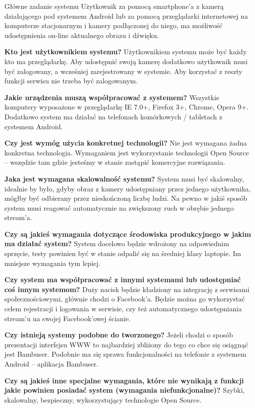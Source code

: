 \begin{userstory}{Główne zadanie systemu}
Użytkownik za pomocą smartphone'a z kamerą działającego pod systemem Android lub za pomocą przeglądarki internetowej na komputerze stacjonarnym i kamery podłączonej do niego, ma możliwość udostępnienia on-line aktualnego obrazu i dźwięku.
    \begin{questions}
        \item{
            \textbf{Kto jest użytkownikiem systemu?} Użytkownikiem systemu może być każdy kto ma przeglądarkę. Aby udostępnić swoją kamerę dodatkowo użytkownik musi być zalogowany, a wcześniej zarejestrowany w systemie. Aby korzystać z reszty funkcji serwisu nie trzeba być zalogowanym.
        }
        \item{
            \textbf{Jakie urządzenia muszą współpracować z systemem?} Wszystkie komputery wyposażone w przeglądarkę IE 7.0+, Firefox 3+, Chrome, Opera 9+. Dodatkowo system ma działać na telefonach komórkowych / tabletach z systemem Android.
        }
        \item{
            \textbf{Czy jest wymóg użycia konkretnej technologii?} Nie jest wymagana żadna konkretna technologia. Wymaganiem jest wykorzystanie technologii Open Source -- wszędzie tam gdzie jesteśmy w stanie zastąpić komercyjne rozwiązania.
        }
        \item{
            \textbf{Jaka jest wymagana skalowalność systemu?} System musi być skalowalny, idealnie by było, gdyby obraz z kamery udostępniany przez jednego użytkownika, mógłby być odbierany przez nieskończoną liczbę ludzi. Na pewno w jakiś sposób system musi reagować automatycznie na zwiększony ruch w obrębie jednego stream'a.
        }
        \item{
            \textbf{Czy są jakieś wymagania dotyczące środowiska produkcyjnego w jakim ma działać system?} System docelowo będzie wdrożony na odpowiednim sprzęcie, testy powinien być w stanie odpalić się na średniej klasy laptopie. Im mniejsze wymagania tym lepiej.
        }
        \item{
            \textbf{Czy system ma współpracować z innymi systemami lub udostępniać coś innym systemom?} Duży nacisk będzie kładziony na integrację z serwisami społecznościowymi, głównie chodzi o Facebook'a. Będzie można go wykorzystać celem rejestracji i logowania w serwisie, czy też automatycznego udostępniania stream'u na swojej Facebook'owej ścianie.
        }
        \item{
            \textbf{Czy istnieją systemy podobne do tworzonego?} Jeżeli chodzi o sposób prezentacji interfejsu WWW to najbardziej zbliżony do tego co chce się osiągnąć jest Bambuser. Podobnie ma się sprawa funkcjonalności na telefonie z systemem Android -- aplikacja Bambuser.
        }
        \item{
            \textbf{Czy są jakieś inne specjalne wymagania, które nie wynikają z funkcji jakie powinien posiadać system (wymagania niefunkcjonalne)?} Szybki, skalowalny, bezpieczny, wykorzystujący technologie Open Source.
        }
    \end{questions}
\end{userstory}

